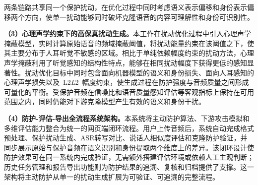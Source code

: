 两条链路共享同一个保护扰动，在优化过程中同时考虑语义表示偏移和身份表示偏移两个方向，使单一扰动能够同时破坏克隆语音的内容可理解性和身份可识别性。

\textbf{（3）心理声学约束下的高保真扰动生成。}本工作在扰动优化过程中引入心理声学掩蔽模型，实时计算原始语音的频域掩蔽阈值，将扰动能量约束在该阈值之下，使其主要分布于人耳听觉不敏感的区域。相比于单纯依赖幅度约束的扰动方法，心理声学掩蔽利用了听觉感知的结构性特点，能够在相同扰动幅度下获得更低的感知显著性。扰动优化目标中同时包含面向机器模型的语义和身份损失、面向人耳感知的心理声学损失以及~L2\emph{L}2\hspace{0pt}~幅度约束，使生成过程在防护强度与音频质量之间形成可量化的平衡。受保护音频在信噪比和语音质量感知评估等客观指标上保持在可用范围之内，同时仍能对下游克隆模型产生有效的语义和身份干扰。

\textbf{（4）防护-评估-导出全流程系统架构。}本系统将主动防护算法、下游攻击模拟和多维评估能力整合为统一的网页端闭环流程。用户上传音频后，系统自动完成格式预处理、保护扰动生成、ASR转写对比、说话人相似度评估和克隆防护验证，并同步展示原始与保护音频在语义识别和身份提取两个维度上的差异。该闭环设计使防护效果可在同一系统内完成验证，无需额外搭建评估环境或依赖人工主观判断；历史任务管理和报告导出功能则为防护结果的追溯、复核和归档提供了支撑。这一架构将主动防护从单一的扰动生成扩展为可验证、可追溯的完整流程。

\FloatBarrier
